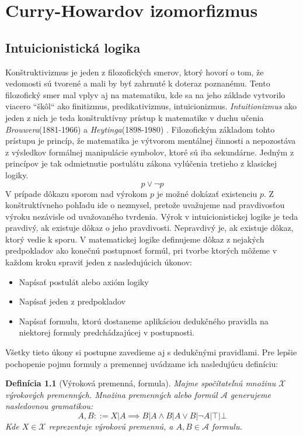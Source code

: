 \documentclass[a4paper,10pt,oneside]{report}%
\newtheorem{definition}{Definícia}[chapter]
\begin{document}
\chapter{Curry-Howardov izomorfizmus}
\section{Intuicionistická logika}
    Konštruktivizmus je jeden z filozofických smerov, ktorý hovorí o tom, že vedomosti
sú tvorené a mali by byť zahrnuté k doteraz poznanému.
    Tento filozofický smer mal vplyv aj na matematiku, kde sa na jeho základe
vytvorilo viacero ``škôl`` ako finitizmus, predikativizmus, intuicionizmus.
    \emph{Intuitionizmus} ako jeden z nich je teda konštruktívny prístup k matematike
v duchu učenia \emph{Brouwera}(1881-1966) a \emph{Heytinga}(1898-1980) \cite{constructivism}.
    Filozofickým základom tohto prístupu je princíp, že matematika je výtvorom mentálnej
činnosti a nepozostáva z výsledkov formálnej manipulácie symbolov, ktoré sú iba
sekundárne.
    Jedným z princípov je tak odmietnutie postulátu zákona vylúčenia tretieho
z klasickej logiky.
\begin{equation}
    p \vee \neg p
\end{equation}
    V prípade dôkazu sporom nad výrokom $p$ je možné dokázať existenciu $p$.
    Z konštruktívneho pohľadu ide o nezmysel, pretože uvažujeme nad pravdivosťou
    výroku nezávisle od uvažovaného tvrdenia.
    Výrok v intuicionistickej logike je teda pravdivý, ak existuje dôkaz o jeho pravdivosti.
    Nepravdivý je, ak existuje dôkaz, ktorý vedie k sporu.
    V matematickej logike definujeme dôkaz z nejakých predpokladov ako konečnú postupnosť
formúl, pri tvorbe ktorých môžeme v každom kroku spraviť jeden z nasledujúcich
úkonov:
\begin{itemize}
    \item Napísať postulát alebo axióm logiky
    \item Napísať jeden z predpokladov
    \item Napísať formulu, ktorú dostaneme aplikáciou dedukčného pravidla na niektorej
formuly predchádzajúcej v postupnosti.
\end{itemize}
    Všetky tieto úkony si postupne zavedieme aj s dedukčnými pravidlami.
    Pre lepšie pochopenie pojmu formuly a premennej uvádzame ich nasledujúcu definíciu:
\begin{definition}[Výroková premenná, formula]
    Majme spočítateľnú množinu $\mathcal{X}$ výrokových premenných. Množina premenných
    alebo formúl $\mathcal{A}$ generujeme nasledovnou gramatikou:
    \begin{equation}
        A, B ::= X | A \implies B | A \wedge B | A \vee B | \neg A | \top | \bot
    \end{equation}
    Kde $X \in \mathcal{X}$ reprezentuje výrokovú premennú, a $A, B \in \mathcal{A}$
    formulu.
\end{definition}
\end{document}
